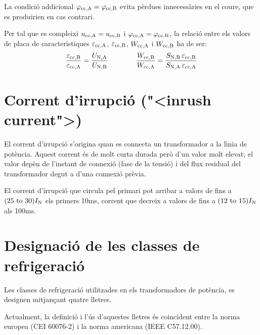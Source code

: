 La condici\'{o} addicional $\varphi_\mathrm{cc,A} =\varphi_\mathrm{cc,B}$ evita p\`{e}rdues innecess\`{a}ries en el coure, que es produirien en cas contrari.

Per tal que es compleixi $u_\mathrm{cc,A} = u_\mathrm{cc,B} $ i $\varphi_\mathrm{cc,A} =\varphi_\mathrm{cc,B}$, la relaci\'{o} entre els valors de placa de caracter\'{\i}stiques $\varepsilon_\mathrm{cc,A}$, $\varepsilon_\mathrm{cc,B}$, $W_\mathrm{cc,A}$ i $W_\mathrm{cc,B}$ ha de ser:
\begin{equation}
    \frac{\varepsilon_\mathrm{cc,B}}{\varepsilon_\mathrm{cc,A}} = \frac{U_\mathrm{N,A}}{U_\mathrm{N,B}} \qquad\qquad
    \frac{W_\mathrm{cc,B}}{W_\mathrm{cc,A}} = \frac{S_\mathrm{N,B} \,\varepsilon_\mathrm{cc,B}}{S_\mathrm{N,A}\, \varepsilon_\mathrm{cc,A}}
\end{equation}

\section{Corrent d'irrupci\'{o} ({"<}inrush current{">})}

El corrent d'irrupci\'{o} s'origina quan es  connecta un transformador a la l\'{\i}nia de pot\`{e}ncia. Aquest corrent \'{e}s de molt curta durada per\`{o} d'un valor molt elevat; el valor dep\`{e}n de l'instant de connexi\'{o} (fase de la tensi\'{o}) i del flux residual del transformador degut a d'una connexi\'{o} pr\`{e}via.

El corrent d'irrupci\'{o} que circula pel primari pot arribar a valors de fins a $(\numrange{25}{30}) I\ped{N}$ els primers 10\unit{ms}, corrent que decreix a valors de fins  a $(\numrange{12}{15}) I\ped{N}$ als 100\unit{ms}.

\section{Designaci\'{o} de les classes de refrigeraci\'{o}}\label{sec:trafos-pot-refrig}
 

Les classes de refrigeraci\'{o} utilitzades en els transformadors de
pot\`{e}ncia, es designen mitjan\c{c}ant quatre lletres.

Actualment, la definici\'{o} i l'\'{u}s d'aquestes lletres \'{e}s coincident
entre la norma europea (\textsf{CEI 60076-2}) i la norma americana
(\textsf{IEEE C57.12.00}).

